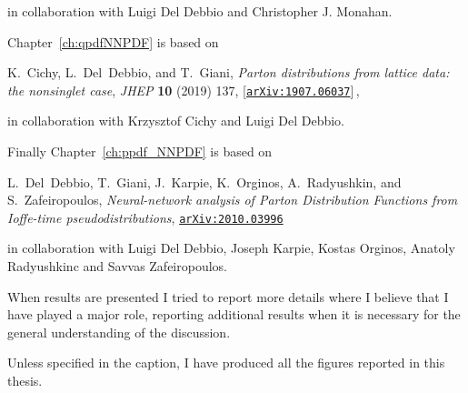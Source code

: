 in collaboration with Luigi Del Debbio and Christopher J. Monahan.

Chapter~\ref{ch:qpdfNNPDF} is based on

K.~Cichy, L.~Del~Debbio, and T.~Giani, {\it {Parton distributions from lattice
  data: the nonsinglet case}},  {\em JHEP} {\bf 10} (2019) 137,
  [\href{http://arxiv.org/abs/1907.06037}{{\tt arXiv:1907.06037}}]\,,

in collaboration with Krzysztof Cichy and Luigi Del Debbio.

Finally Chapter~\ref{ch:ppdf_NNPDF} is based on

L.~Del~Debbio, T.~Giani, J.~Karpie, K.~Orginos, A.~Radyushkin, and
  S.~Zafeiropoulos, {\it {Neural-network analysis of Parton Distribution
  Functions from Ioffe-time pseudodistributions}},
  \href{http://arxiv.org/abs/2010.03996}{{\tt arXiv:2010.03996}}  

in collaboration with Luigi Del Debbio, Joseph Karpie, Kostas Orginos, Anatoly
Radyushkinc and Savvas Zafeiropoulos.

When results are presented I tried to report more details where I believe that I have played a major role,
reporting additional results when it is necessary for the general understanding of the discussion. 

Unless specified in the caption, I have produced all the figures reported in this thesis.


